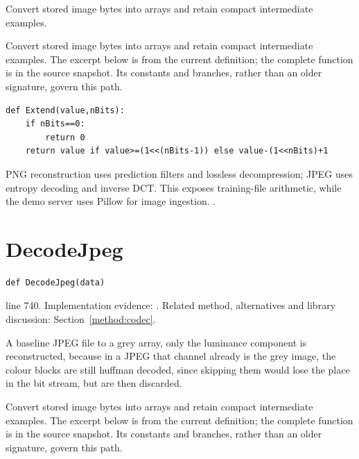 Convert stored image bytes into arrays and retain compact intermediate examples.


Convert stored image bytes into arrays and retain compact intermediate examples. The excerpt below is from the current definition; the complete function is in the source snapshot. Its constants and branches, rather than an older signature, govern this path.


\begin{lstlisting}[style=plain]
def Extend(value,nBits):
    if nBits==0:
        return 0
    return value if value>=(1<<(nBits-1)) else value-(1<<nBits)+1
\end{lstlisting}
PNG reconstruction uses prediction filters and lossless decompression; JPEG uses entropy decoding and inverse DCT. This exposes training-file arithmetic, while the demo server uses Pillow for image ingestion. \cite{pngspec,jpegspec,pillowimage}.


\section{DecodeJpeg}\label{fn:train:DecodeJpeg}
\begin{lstlisting}[style=sig]
def DecodeJpeg(data)
\end{lstlisting}
 line 740. Implementation evidence: \cite{code2026}. Related method, alternatives and library discussion: Section~\ref{method:codec}.


A baseline JPEG file to a grey array, only the luminance component is reconstructed, because in a JPEG that channel already is the grey image, the colour blocks are still huffman decoded, since skipping them would lose the place in the bit stream, but are then discarded.


Convert stored image bytes into arrays and retain compact intermediate examples. The excerpt below is from the current definition; the complete function is in the source snapshot. Its constants and branches, rather than an older signature, govern this path.


